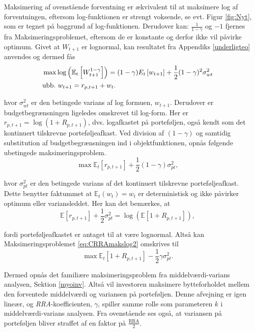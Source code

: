 \documentclass[
  a4paper,
  oneside]{memoir}
\begin{document}
Maksimering af ovenstående forventning er ækvivalent til at maksimere log af forventningen, eftersom log-funktionen er strengt voksende, se evt. Figur \ref{fig:Nyt}, som er tegnet på baggrund af log-funktionen. Derudover kan: \(\tfrac{1}{1-\gamma}\) og \(-1\) fjernes fra Maksimeringsproblemet, eftersom de er konstante og derfor ikke vil påvirke optimum. Givet at \(W_{t+1}\) er lognormal, kan resultatet fra Appendiks \ref{underligteo} anvendes og dermed fås
\begin{align}
&\max \log\left(\mathbb{E}_t\left[W_{t+1}^{1-\gamma}\right]\right)=(1-\gamma){E}_t\left[w_{t+1}\right]+\frac{1}{2}(1-\gamma)^2\sigma_{wt}^2 \label{eq:CRRAmakslog}\\
&\text{ubb.}\,\,w_{t+1}=r_{p,t+1} + w_t.\notag
\end{align}

hvor \(\sigma_{wt}^2\) er den betingede varians af log formuen, \(w_{t+1}\). Derudover er budgetbegrænsningen ligeledes omskrevet til log-form. Her er \(r_{p,t+1}=\log(1+R_{p,t+1})\), dvs. logafkastet på porteføljen, også kendt som det kontinuert tilskrevne porteføljeafkast. Ved division af \((1-\gamma)\) og samtidig substitution af budgetbegrænsningen ind i objektfunktionen, opnås følgende ubetingede maksimeringsproblem.
\begin{equation}
\max\mathbb{E}_t\left[r_{p,t+1}\right] + \frac{1}{2}(1-\gamma)\sigma_{pt}^2, \label{eq:CRRAmakslog2}
\end{equation}

hvor \(\sigma_{pt}^2\) er den betingede varians af det kontinuert tilskrevne porteføljeafkast. Dette benytter faktummet at \(\mathbb{E}_t(w_t)=w_t\) er deterministisk og ikke påvirker optimum eller variansleddet. Her kan det bemærkes, at
\begin{equation}
\mathbb{E}\left[r_{p,t+1}\right]+\frac{1}{2}\sigma_{pt}^2=\log(\mathbb{E}\left[1+R_{p,t+1}\right]), \label{eq:portafkls}
\end{equation}

fordi porteføljeafkastet er antaget til at være lognormal. Altså kan Maksimeringsproblemet \eqref{eq:CRRAmakslog2} omskrives til
\begin{equation}
\max\mathbb{E}_t[1+R_{p,t+1}] - \frac{1}{2}\gamma\sigma_{pt}^2. \label{eq:CRRAmakslog3}
\end{equation}

Dermed opnås det familiære maksimeringsproblem fra middelværdi-varians analysen, Sektion \ref{myoinv}. Altså vil investoren maksimere bytteforholdet mellem den forventede middelværdi og variansen på porteføljen. Denne afvejning er igen lineær, og \emph{RRA}-koefficienten, \(\gamma\), spiller samme rolle som parameteren \(k\) i middelværdi-varians analysen. Fra ovenstående ses også, at variansen på porteføljen bliver straffet af en faktor på \(\tfrac{\text{RRA}}{2}\).
\end{document}
